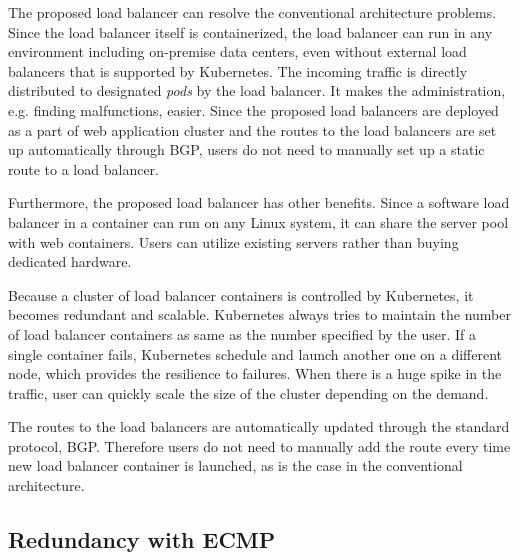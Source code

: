 The proposed load balancer can resolve the conventional architecture problems.
Since the load balancer itself is containerized, the load balancer can run in any environment including on-premise data centers,
even without external load balancers that is supported by Kubernetes.
The incoming traffic is directly distributed to designated {\em pods} by the load balancer.
It makes the administration, e.g. finding malfunctions, easier.
Since the proposed load balancers are deployed as a part of web application cluster and the routes to the load balancers are set up automatically through BGP, users do not need to manually set up a static route to a load balancer.

Furthermore, the proposed load balancer has other benefits.
Since a software load balancer in a container can run on any Linux system, it can share the server pool with web containers.
Users can utilize existing servers rather than buying dedicated hardware.

Because a cluster of load balancer containers is controlled by Kubernetes, it becomes redundant and scalable.
Kubernetes always tries to maintain the number of load balancer containers as same as the number specified by the user.
If a single container fails, Kubernetes schedule and launch another one on a different node, which provides the resilience to failures.
When there is a huge spike in the traffic, user can quickly scale the size of the cluster depending on the demand.

The routes to the load balancers are automatically updated through the standard protocol, BGP.
Therefore users do not need to manually add the route every time new load balancer container is launched, as is the case in the conventional architecture.

\FloatBarrier

\subsection{Redundancy with ECMP}\label{Redundancy with ECMP}

